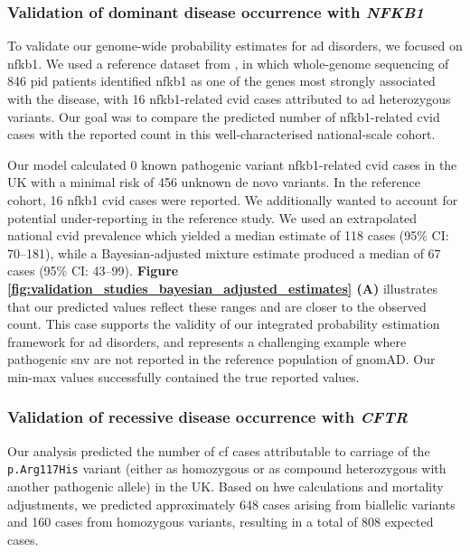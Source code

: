 \subsubsection{Validation of dominant disease occurrence with \textit{NFKB1}}

To validate our genome-wide probability estimates for \ac{ad} disorders, we focused on \ac{nfkb1}.
We used a reference dataset from \citet{tuijnenburgNFKB12018}, in which whole-genome sequencing of 846 \ac{pid} patients identified \ac{nfkb1} as one of the genes most strongly associated with the disease, with 16 \ac{nfkb1}-related \ac{cvid} cases attributed to \ac{ad} heterozygous variants. 
Our goal was to compare the predicted number of \ac{nfkb1}-related \ac{cvid} cases with the reported count in this well-characterised national-scale cohort.

Our model calculated 0 known pathogenic variant \ac{nfkb1}-related \ac{cvid} cases in the UK with a minimal risk of 456 unknown de novo variants. In the reference cohort, 16 \ac{nfkb1} \ac{cvid} cases were reported. 
We additionally wanted to account for potential under-reporting in the reference study. 
We used an extrapolated national \ac{cvid} prevalence which yielded a median estimate of 118 cases (95\% CI: 70–181), while a Bayesian-adjusted mixture estimate produced a median of 67 cases (95\% CI: 43–99). \textbf{Figure \ref{fig:validation_studies_bayesian_adjusted_estimates} (A)} illustrates that our predicted values reflect these ranges and are closer to the observed count. 
This case supports the validity of our integrated probability estimation framework for \ac{ad} disorders, and represents a challenging example where pathogenic \ac{snv} are not reported in the reference population of gnomAD. Our min-max values successfully contained the true reported values.


\subsubsection{Validation of recessive disease occurrence with \textit{CFTR}}

Our analysis predicted the number of \ac{cf} cases attributable to carriage of the \texttt{p.Arg117His} variant (either as homozygous or as compound heterozygous with another pathogenic allele) in the UK. Based on \ac{hwe} calculations and mortality adjustments, we predicted approximately 648 cases arising from biallelic variants and 160 cases from homozygous variants, resulting in a total of 808 expected cases.

